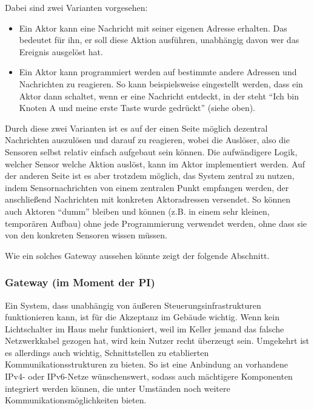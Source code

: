 \documentclass{IEEEtran}
\begin{document}
            Dabei sind zwei Varianten vorgesehen:
            \begin{itemize}
                \item Ein Aktor kann eine Nachricht mit seiner eigenen Adresse
                    erhalten. Das bedeutet für ihn, er soll diese Aktion
                    ausführen, unabhängig davon wer das Ereignis ausgelöst hat.
                \item Ein Aktor kann programmiert werden auf bestimmte andere
                    Adressen und Nachrichten zu reagieren.
                    So kann beispielsweise eingestellt werden, dass ein Aktor
                    dann schaltet, wenn er eine Nachricht entdeckt, in der steht
                    \enquote{Ich bin Knoten A und meine erste Taste
                    wurde gedrückt} (siehe oben).
            \end{itemize}

            Durch diese zwei Varianten ist es auf der einen Seite möglich
            dezentral Nachrichten auszulösen und darauf zu reagieren, wobei
            die Auslöser, also die Sensoren selbst relativ einfach aufgebaut
            sein können. Die aufwändigere Logik, welcher Sensor welche Aktion
            auslöst, kann im Aktor implementiert werden.
            Auf der anderen Seite ist es aber trotzdem möglich, das System
            zentral zu nutzen, indem Sensornachrichten von einem zentralen
            Punkt empfangen werden, der anschließend Nachrichten mit konkreten
            Aktoradressen versendet. So können auch Aktoren \enquote{dumm}
            bleiben und können (z.B. in einem sehr kleinen, temporären Aufbau)
            ohne jede Programmierung verwendet werden, ohne dass sie von den
            konkreten Sensoren wissen müssen.

            Wie ein solches Gateway aussehen könnte zeigt der folgende Abschnitt.

        \subsubsection{Gateway (im Moment der PI)}
            Ein System, dass unabhängig von äußeren Steuerungsinfrastrukturen
            funktionieren kann, ist für die Akzeptanz im Gebäude wichtig.
            Wenn kein Lichtschalter im Haus mehr funktioniert, weil
            im Keller jemand das falsche Netzwerkkabel gezogen hat,
            wird kein Nutzer recht überzeugt sein.
            Umgekehrt ist es allerdings auch wichtig, Schnittstellen zu
            etablierten Kommunikationsstrukturen zu bieten.
            So ist eine Anbindung an vorhandene IPv4- oder IPv6-Netze
            wünschenswert, sodass auch mächtigere Komponenten integriert werden
            können, die unter Umständen noch weitere Kommunikationsmöglichkeiten
            bieten.
\end{document}
